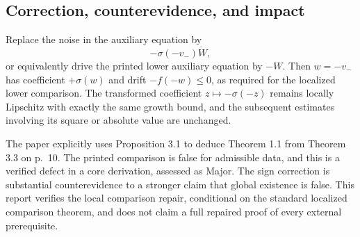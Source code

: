 \documentclass[10pt]{article}
\begin{document}
\subsection*{Correction, counterevidence, and impact}
Replace the noise in the auxiliary equation by \[-\sigma(-v_-)\dot W,\] or equivalently drive the printed lower auxiliary equation by \(-W\). Then \(w=-v_-\) has coefficient \(+\sigma(w)\) and drift \(-f(-w)\le0\), as required for the localized lower comparison. The transformed coefficient \(z\mapsto-\sigma(-z)\) remains locally Lipschitz with exactly the same growth bound, and the subsequent estimates involving its square or absolute value are unchanged.\par
The paper explicitly uses Proposition 3.1 to deduce Theorem 1.1 from Theorem 3.3 on p. 10. The printed comparison is false for admissible data, and this is a verified defect in a core derivation, assessed as Major. The sign correction is substantial counterevidence to a stronger claim that global existence is false. This report verifies the local comparison repair, conditional on the standard localized comparison theorem, and does not claim a full repaired proof of every external prerequisite.\par
\end{document}
